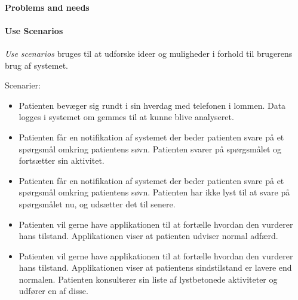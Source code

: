 \paragraph{Problems and needs}

\paragraph{Use Scenarios}
\textit{Use scenarios} bruges til at udforske ideer og muligheder i forhold til brugerens brug af systemet.

Scenarier:
\begin{itemize}
	\item Patienten bevæger sig rundt i sin hverdag med telefonen i lommen. 
	Data logges i systemet om gemmes til at kunne blive analyseret.
	\item Patienten får en notifikation af systemet der beder patienten svare på et spørgsmål omkring patientens søvn.
	Patienten svarer på spørgsmålet og fortsætter sin aktivitet.
	\item Patienten får en notifikation af systemet der beder patienten svare på et spørgsmål omkring patientens søvn.
	Patienten har ikke lyst til at svare på spørgsmålet nu, og udsætter det til senere.
	\item Patienten vil gerne have applikationen til at fortælle hvordan den vurderer hans tilstand.
	Applikationen viser at patienten udviser normal adfærd.
	\item Patienten vil gerne have applikationen til at fortælle hvordan den vurderer hans tilstand.
	Applikationen viser at patientens sindstilstand er lavere end normalen.
	Patienten konsulterer sin liste af lystbetonede aktiviteter og udfører en af disse.
\end{itemize}


